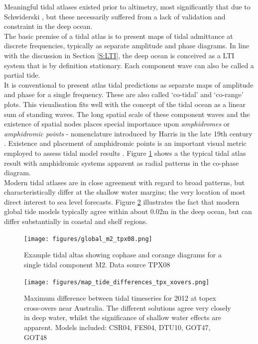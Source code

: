 Meaningful tidal atlases existed prior to altimetry, most significantly that due to Schwiderski \citep{Schwiderski:1983ke}, but these necessarily suffered from a lack of validation and constraint in the deep ocean.\\
The basic premise of a tidal atlas is to present maps of tidal admittance at discrete frequencies, typically as separate amplitude and phase diagrams.   In line with the discussion in Section \ref{S:LTI}, the deep ocean is conceived as a LTI system that is by definition stationary.  Each component wave can also be called a partial tide.\\
It is conventional to present atlas tidal predictions as separate maps of amplitude and phase for a single frequency.  These are also called `co-tidal' and `co-range' plots.  This visualisation fits well with the concept of the tidal ocean as a linear sum of standing waves.   The long spatial scale of these component waves and the existence of spatial nodes places special importance upon \emph{amphidromes} or \emph{amphidromic points} - nomenclature introduced by Harris in the late 19th century \cite[pp 119]{Cartwright:2000tt}.  Existence and placement of amphidromic points is an important visual metric employed to assess tidal model results \citep{foreman:2012perscomm}.  Figure \ref{fig:atlas} shows a the typical tidal atlas result with amphidromic systems apparent as radial patterns in the co-phase diagram.\\
Modern tidal atlases are in close agreement with regard to broad patterns, but characteristically differ at the shallow water margins; the very location of most direct interest to sea level forecasts.  Figure \ref{fig:tpx_cross} illustrates the fact that modern global tide models typically agree within about 0.02m in the deep ocean, but can differ substantially in coastal and shelf regions.  


\begin{figure}[h]
\begin{center}
\texttt{[image: figures/global\_m2\_tpx08.png]}
\caption{Example tidal altas showing cophase and corange diagrams for a single tidal component M2.  Data source TPX08 \cite{Egbert:2002ug}  }
\label{fig:atlas}
\end{center}
\end{figure}


\begin{figure}[h]
\begin{center}
\texttt{[image: figures/map\_tide\_differences\_tpx\_xovers.png]}
\caption{Maximum difference between tidal timeseries for 2012 at topex cross-overs near Australia.  The different solutions agree very closely in deep water, whilst the significance of shallow water effects are apparent.  Models included: CSR04\citep{Eanes:1996tr}, FES04\citep{Lyard:2006ir}, DTU10\citep{IMPROVEMENTOFGLOBA:2010tu}, GOT47, GOT48\citep{Schrama:1994vr}\citep{Ray:1999vm} }
\label{fig:tpx_cross}
\end{center}
\end{figure}


